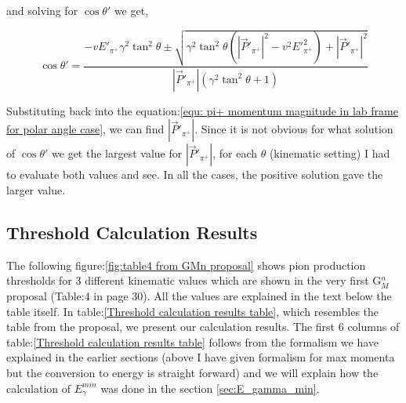  and solving for $\cos{\theta'}$ we get,

  \begin{equation}
    \cos{\theta'} = \frac{-vE'_{\pi^+}\gamma^2\tan^2{\theta} \pm \sqrt{\gamma^2\tan^2{\theta}(|\vec{P}'_{\pi^+}|^2-v^2E'^{2}_{\pi^+})+|\vec{P}'_{\pi^+}|^2}}{|\vec{P}'_{\pi^+}|(\gamma^2\tan^2{\theta} + 1)}
 \end{equation}

Substituting back into the equation:\ref{equ: pi+ momentum magnitude in lab frame for polar angle case}, we can find $|\vec{P}'_{\pi^+}|$. Since it is not obvious for what solution of $\cos{\theta'}$ we get the largest value for $|\vec{P}'_{\pi^+}|$, for each $\theta$ (kinematic setting) I had to evaluate both values and see. In all the cases, the positive solution gave the larger value.


\subsection{Threshold Calculation Results}

The following figure:\ref{fig:table4 from GMn proposal} shows pion production thresholds for 3 different kinematic values which are shown in the very first G$_M^n$ proposal (Table:4 in page 30). All the values are explained in the text below the table itself. In table:\ref{Threshold calculation results table}, which resembles the table from the proposal, we present our calculation results. The first 6 columns of table:\ref{Threshold calculation results table} follows from the formalism we have explained in the earlier sections (above I have given formalism for max momenta but the conversion to energy is straight forward) and we will explain how the calculation of $E^{min}_\gamma$ was done in the section \ref{sec:E_gamma_min}.

